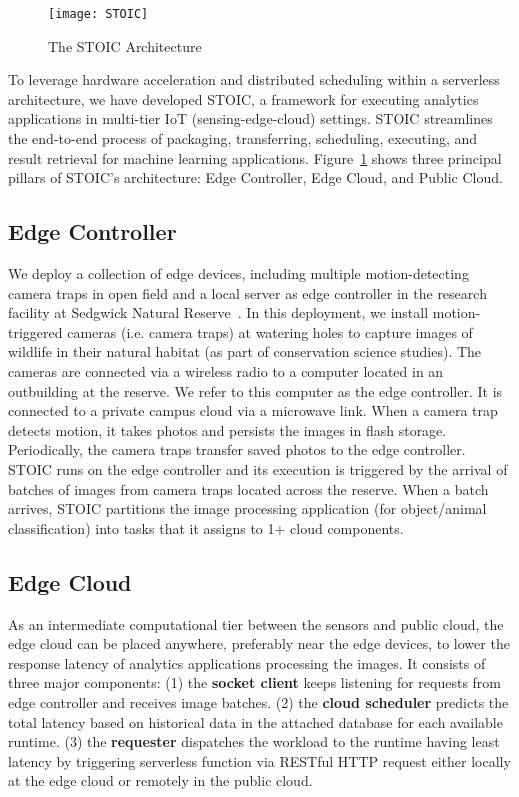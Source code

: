 \begin{figure}
    \centering
    \texttt{[image: STOIC]}
    \caption{The STOIC Architecture \label{fig:STOIC}}
\end{figure}

To leverage hardware acceleration and distributed scheduling within a serverless architecture, we have developed STOIC, a framework for executing analytics applications in multi-tier IoT (sensing-edge-cloud) settings. STOIC streamlines the end-to-end process of packaging, transferring, scheduling, executing, and result retrieval for machine learning applications. Figure~\ref{fig:STOIC} shows three principal pillars of STOIC's architecture: Edge Controller, Edge Cloud, and Public Cloud.

\subsection{Edge Controller}
 We deploy a collection of edge devices, including multiple motion-detecting camera traps in open field and a local server as edge controller in the research facility at Sedgwick Natural Reserve~\cite{ref:sedgwick}. 
In this deployment, we install motion-triggered cameras (i.e. camera traps) at watering holes to capture images of wildlife in their natural habitat (as part of conservation science studies). The cameras are connected via a wireless radio to a computer located in an outbuilding at the reserve. We refer to this computer as the edge controller.  It is connected to a private campus cloud via a microwave link. When a camera trap detects motion, it takes photos and persists the images in flash storage. Periodically, the camera traps transfer saved photos to the edge controller. STOIC runs on the edge controller and its execution is triggered by the arrival of batches of images from camera traps located across the reserve. When a batch arrives, STOIC partitions the image processing application (for object/animal classification) into tasks that it assigns to 1+ cloud components.
 
 \subsection{Edge Cloud}
 
As an intermediate computational tier between the sensors and public cloud, the edge cloud can be placed anywhere, preferably near the edge devices, to lower the response latency of analytics applications processing the images. It consists of three major components: (1) the \textbf{socket client} keeps listening for requests from edge controller and receives image batches. (2) the \textbf{cloud scheduler} predicts the total latency based on historical data in the attached database for each available runtime. (3) the \textbf{requester} dispatches the workload to the runtime having least latency by triggering serverless function via RESTful HTTP request either locally at the edge cloud or remotely in the public cloud. 

